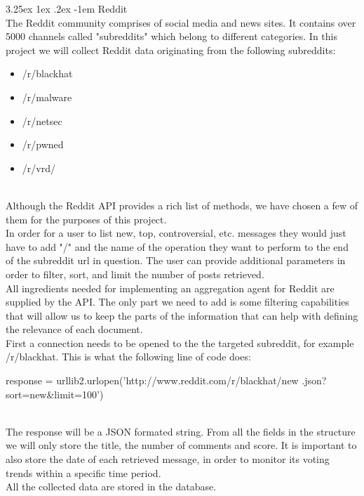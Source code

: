 \documentclass[12pt]{article}
\makeatletter
\renewcommand\paragraph{\@startsection{paragraph}{5}{\z@}%
  {3.25ex \@plus1ex \@minus.2ex}%
  {-1em}%
  {\normalfont\normalsize\bfseries}}
\makeatother
\begin{document}
\paragraph{Reddit}
\hfill \break
\\
The Reddit community comprises of social media and news sites. It contains over 5000 channels called "subreddits" which belong to different categories. In this project we will collect Reddit \cite{reddit} data originating from the following subreddits:
\begin{itemize}
\item /r/blackhat \cite{r.blackhat}
\item /r/malware \cite{r.malware}
\item /r/netsec \cite{r.netsec}
\item /r/pwned \cite{r.pwned}
\item /r/vrd/ \cite{r.rvd}

\end{itemize}
\hfill \break
\\
Although the Reddit API \cite{reddit} provides a rich list of methods, we have chosen a few of them for the purposes of this project.\\
\hfill \break
In order for a user to list new, top, controversial, etc. messages they would just have to add "/" and the name of the operation they want to perform to the end of the subreddit url in question. The user can provide additional parameters in order to filter, sort, and limit the number of posts retrieved. 
\hfill \break
\\
All ingredients needed for implementing an aggregation agent for Reddit are supplied by the API. The only part we need to add is some filtering capabilities that will allow us to keep the parts of the information that can help with defining the relevance of each document.
\hfill \break
\\
First a connection needs to be opened to the the targeted subreddit, for example /r/blackhat. This is what the following line of code does:

\begin{spverbatim}
response = urllib2.urlopen('http://www.reddit.com/r/blackhat/new
			.json?sort=new&limit=100')
\end{spverbatim}
\hfill \break
\\
The response will be a JSON formated string. From all the fields in the structure we will only store the title, the number of comments and score. It is important to also store the date of each retrieved message, in order to monitor its voting trends within a specific time period.
\hfill \break
\\
All the collected data are stored in the database. 
\end{document}

